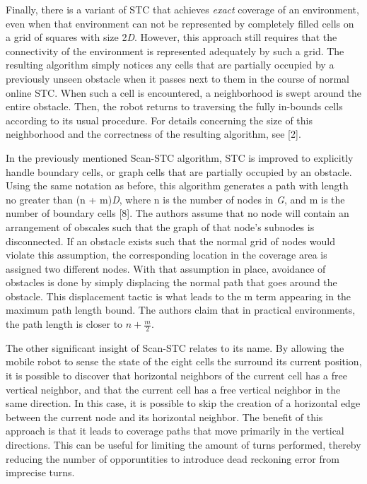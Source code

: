 \documentclass[letterpaper, 12pt, leqno]{report}
\begin{document}
Finally, there is a variant of STC that achieves \textit{exact} coverage of an environment, even when that environment can not be represented by completely filled cells on a grid of squares with size 2\textit{D}. However, this approach still requires that the connectivity of the environment is represented adequately by such a grid. The resulting algorithm simply notices any cells that are partially occupied by a previously unseen obstacle when it passes next to them in the course of normal online STC. When such a cell is encountered, a neighborhood is swept around the entire obstacle. Then, the robot returns to traversing the fully in-bounds cells according to its usual procedure. For details concerning the size of this neighborhood and the correctness of the resulting algorithm, see [2].

In the previously mentioned Scan-STC algorithm, STC is improved to explicitly handle boundary cells, or graph cells that are partially occupied by an obstacle. Using the same notation as before, this algorithm generates a path with length no greater than (n + m)\textit{D}, where n is the number of nodes in \textit{G}, and m is the number of boundary cells [8]. The authors assume that no node will contain an arrangement of obscales such that the graph of that node's subnodes is disconnected. If an obstacle exists such that the normal grid of nodes would violate this assumption, the corresponding location in the coverage area is assigned two different nodes. With that assumption in place, avoidance of obstacles is done by simply displacing the normal path that goes around the obstacle. This displacement tactic is what leads to the m term appearing in the maximum path length bound. The authors claim that in practical environments, the path length is closer to $ n + \frac{m}{2} $.

The other significant insight of Scan-STC relates to its name. By allowing the mobile robot to sense the state of the eight cells the surround its current position, it is possible to discover that horizontal neighbors of the current cell has a free vertical neighbor, and that the current cell has a free vertical neighbor in the same direction. In this case, it is possible to skip the creation of a horizontal edge between the current node and its horizontal neighbor. The benefit of this approach is that it leads to coverage paths that move primarily in the vertical directions. This can be useful for limiting the amount of turns performed, thereby reducing the number of opporuntities to introduce dead reckoning error from imprecise turns.
\end{document}
